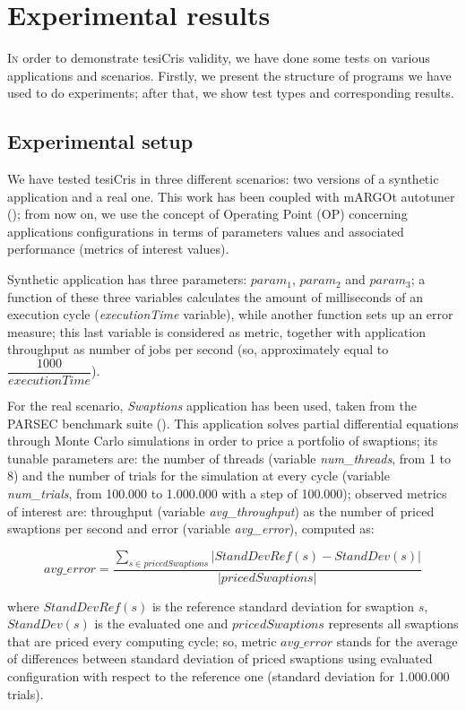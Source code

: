 \chapter{Experimental results}

\lettrine{I}{n} order to demonstrate tesiCris validity, we have done some tests on various applications and scenarios. Firstly, we present the structure of programs we have used to do experiments; after that, we show test types and corresponding results.

\section{Experimental setup}\label{expSetup}

We have tested tesiCris in three different scenarios: two versions of a synthetic application and a real one. This work has been coupled with mARGOt autotuner (\cite{gadioli2015application}); from now on, we use the concept of Operating Point (OP) concerning applications configurations in terms of parameters values and associated performance (metrics of interest values).

Synthetic application has three parameters: $param_1$, $param_2$ and $param_3$; a function of these three variables calculates the amount of milliseconds of an execution cycle (\textit{executionTime} variable), while another function sets up an error measure; this last variable is considered as metric, together with application throughput as number of jobs per second (so, approximately equal to $\dfrac{1000}{\textit{executionTime}}$).

For the real scenario, \textit{Swaptions} application has been used, taken from the PARSEC benchmark suite (\cite{bienia2008parsec}). This application solves partial differential equations through Monte Carlo simulations in order to price a portfolio of swaptions; its tunable parameters are: the number of threads (variable \textit{num\_threads}, from 1 to 8) and the number of trials for the simulation at every cycle (variable \textit{num\_trials}, from 100.000 to 1.000.000 with a step of 100.000); observed metrics of interest are: throughput (variable \textit{avg\_throughput}) as the number of priced swaptions per second and error (variable \textit{avg\_error}), computed as:

\[
avg\_error = \dfrac{\sum_{s \in pricedSwaptions} \left\vert StandDevRef(s) - StandDev(s) \right\vert}{\left\vert pricedSwaptions \right\vert}
\]

where $StandDevRef(s)$ is the reference standard deviation for swaption $s$, $StandDev(s)$ is the evaluated one and $pricedSwaptions$ represents all swaptions that are priced every computing cycle; so, metric $avg\_error$ stands for the average of differences between standard deviation of priced swaptions using evaluated configuration with respect to the reference one (standard deviation for 1.000.000 trials).

